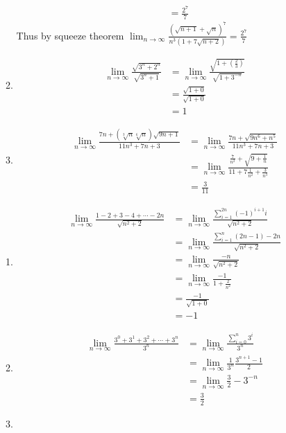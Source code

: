 \documentclass[12pt, letterpaper]{article}
\begin{document}
\begin{enumerate}
\begin{enumerate}
\begin{align*}
		&= \frac{2^7}{7}
	\end{align*}
	Thus by squeeze theorem $\lim_{n \to \infty} \frac{(\sqrt{n+1} +\sqrt{n})^7}{n^3(1+ 7 \sqrt{n+2})} = \frac{2^7}{7}$
	\item 
	\begin{align*}
		\lim_{n \to \infty} \frac{\sqrt{3^n + 2^n}}{\sqrt{3^n + 1}} &=
		\lim_{n \to \infty} \frac{\sqrt{1 + \left(\frac{2}{3}\right)}}{\sqrt{1 + 3^{-n}}}\\
		&= \frac{\sqrt{1 + 0}}{\sqrt{1 + 0}}\\
		&= 1
	\end{align*}
	\item 
	\begin{align*}
		\lim_{n \to \infty} \frac{7n + (\sqrt[3]{n}\sqrt[6]{n})\sqrt{9n+1}}{11n^3 + 7n + 3} &=\lim_{n \to \infty} \frac{7n + \sqrt{9n^6 + n^5}}{11n^3 + 7n + 3}\\
		&=\lim_{n \to \infty} \frac{\frac{7}{n^2} + \sqrt{9 + \frac{1}{n}}}{11 + 7\frac{1}{n^2} + \frac{3}{n^3}}\\
		&= \frac{3}{11}
	\end{align*}
	\end{enumerate}
	\begin{enumerate}
		\item
		\begin{align*}
			\lim_{n \to \infty} \frac{1-2+3-4+\cdots-2n}{\sqrt{n^2+2}} 
			&= \lim_{n \to \infty} \frac{\sum_{i=1}^{2n} (-1)^{i+1}i}{\sqrt{n^2+2}}\\
			&= \lim_{n \to \infty} \frac{\sum_{i=1}^{n} (2n-1)-2n}{\sqrt{n^2+2}}\\
			&= \lim_{n \to \infty}\frac{-n}{\sqrt{n^2+2}}\\
			&= \lim_{n \to \infty} \frac{-1}{1 + \frac{2}{n^2}}\\
			&= \frac{-1}{\sqrt{1 + 0}}\\
			&=-1
		\end{align*}
		\item 
		\begin{align*}
		\lim_{n \to \infty} \frac{3^0+3^1+3^2+\cdots+ 3^n}{3^n} &= \lim_{n \to \infty} \frac{\sum_{i=0}^n 3^i}{3^n}\\
		&= \lim_{n \to \infty} \frac{1}{3^n} \frac{3^{n+1}-1}{2}\\
		&= \lim_{n \to \infty} \frac{3}{2}-{3}^{-n}\\
		&= \frac{3}{2}
		\end{align*}
		\item 
		\begin{align*}

\end{align*}
\end{enumerate}
\end{enumerate}
\end{document}
